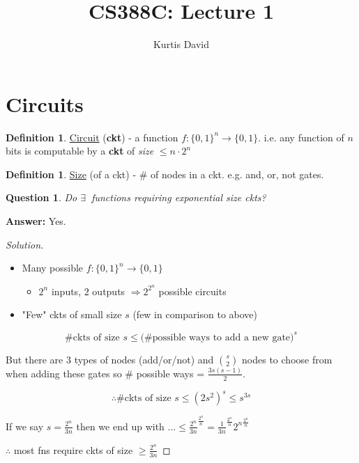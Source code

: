 \documentclass[psamsfonts, 12pt]{amsart}
\newtheorem{quest}[thm]{Question}
\theoremstyle{definition}
\newtheorem{defn}[thm]{Definition}
\theoremstyle{remark}
\let\oldexists\exists
\renewcommand\exists{\oldexists~}
\newenvironment{solution}
  {\begin{proof}[Solution]}
  {\end{proof}}
\begin{document}
%
\author{Kurtis David}
%
\title{CS388C: Lecture 1}
%
\maketitle
%

\section{Circuits}

\begin{defn}
\underline{Circuit} (\textbf{ckt}) - a function $f: \{0,1\}^n \rightarrow \{0,1\}$. i.e. any function of $n$ bits is computable by a \textbf{ckt} of \textit{size} $\leq n\cdot2^n$
\end{defn}

\begin{defn}
\underline{Size} (of a ckt) - \# of nodes in a ckt. e.g. and, or, not gates.
\end{defn}

\begin{quest}
Do $\exists$ functions requiring exponential size ckts?
\end{quest}

\textbf{Answer:} Yes.

\begin{solution}\
\vspace{0.5em}
\begin{itemize}
  \item Many possible $f: \{0,1\}^n\rightarrow\{0,1\}$
  \begin{itemize}
    \item $2^n$ inputs, $2$ outputs $\Rightarrow 2^{2^{n}}$ possible circuits
  \end{itemize}
  \item "Few" ckts of small size $s$ (few in comparison to above)
\end{itemize}

\[
\text{\# ckts of size } s \leq \text{(\# possible ways to add a new gate)}^s
\]

But there are 3 types of nodes (add/or/not) and $s\choose2$ nodes to choose from when adding these gates so \# possible ways = $\frac{3s(s-1)}{2}$.

\[
\therefore \text{\# ckts of size } s \leq (2s^2)^s \leq s^{3s}
\]

If we say $s = \frac{2^n}{3n}$ then we end up with $... \leq \frac{2^n}{3n}^{\frac{2^n}{n}} = \frac{1}{3n}^{\frac{2^n}{n}} {2^n}^{\frac{2^n}{n}}$

$\therefore$ most fns require ckts of size $\geq \frac{2^n}{3n}$

\end{solution}
\end{document}
